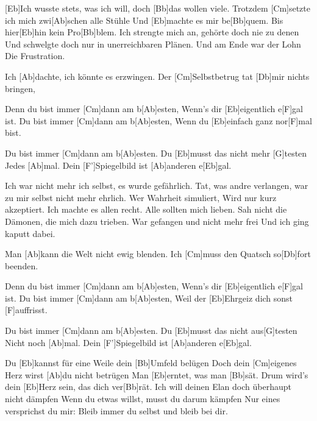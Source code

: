 

\begin{guitar}
	[Eb]Ich wusste stets, was ich will, doch [Bb]das wollen viele.
	Trotzdem [Cm]setzte ich mich zwi[Ab]schen alle Stühle
	Und [Eb]machte es mir be[Bb]quem.
	Bis hier[Eb]hin kein Pro[Bb]blem.
	Ich strengte mich an, gehörte doch nie zu denen
	Und schwelgte doch nur in unerreichbaren Plänen.
	Und am Ende war der Lohn
	Die Frustration.
	
	Ich [Ab]dachte, ich könnte es erzwingen.
	Der [Cm]Selbstbetrug tat [Db]mir nichts bringen,
	
	\begin{highlightbar}
		Denn du bist immer [Cm]dann am b[Ab]esten,
		Wenn's dir [Eb]eigentlich e[F]gal ist.
		Du bist immer [Cm]dann am b[Ab]esten,
		Wenn du [Eb]einfach ganz nor[F]mal bist.
	
		Du bist immer [Cm]dann am b[Ab]esten.
		Du [Eb]musst das nicht mehr [G]testen
		Jedes [Ab]mal.
		Dein [F']Spiegelbild ist [Ab]anderen e[Eb]gal.
	\end{highlightbar}

	\songsection{Strophe 2}
	Ich war nicht mehr ich selbst, es wurde gefährlich.
	Tat, was andre verlangen, war zu mir selbst nicht mehr ehrlich.
	Wer Wahrheit simuliert,
	Wird nur kurz akzeptiert.
	Ich machte es allen recht. Alle sollten mich lieben.
	Sah nicht die Dämonen, die mich dazu trieben.
	War gefangen und nicht mehr frei
	Und ich ging kaputt dabei.
	
	\songsection{Vorrefrain 2}
	Man [Ab]kann die Welt nicht ewig blenden.
	Ich [Cm]muss den Quatsch so[Db]fort beenden.
	
	\begin{highlightbar}
		\songsection{Refrain 2}
		Denn du bist immer [Cm]dann am b[Ab]esten,
		Wenn's dir [Eb]eigentlich e[F]gal ist.
		Du bist immer [Cm]dann am b[Ab]esten,
		Weil der [Eb]Ehrgeiz dich sonst [F]auffrisst.
		
		Du bist immer [Cm]dann am b[Ab]esten.
		Du [Eb]musst das nicht aus[G]testen
		Nicht noch [Ab]mal.
		Dein [F']Spiegelbild ist [Ab]anderen e[Eb]gal.
	\end{highlightbar}
	
	Du [Eb]kannst für eine Weile dein [Bb]Umfeld belügen
	Doch dein [Cm]eigenes Herz wirst [Ab]du nicht betrügen
	Man [Eb]erntet, was man [Bb]sät.
	Drum wird's dein [Eb]Herz sein, das dich ver[Bb]rät.
	Ich will deinen Elan doch überhaupt nicht dämpfen
	Wenn du etwas willst, musst du darum kämpfen
	Nur eines versprichst du mir: 
	Bleib immer du selbst und bleib bei dir.
	

\end{guitar}
